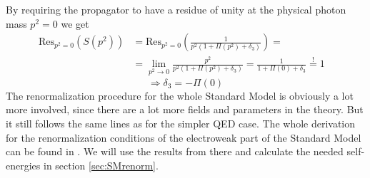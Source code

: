 By requiring the propagator to have a residue of unity at the physical photon mass $p^2=0$ we get
\begin{align*}
\mathrm{Res}_{p^2 = 0} \left( S(p^2) \right) & = \mathrm{Res}_{p^2=0} \left( \frac{1}{p^2 \left( 1 + \Pi(p^2) + \delta_3 \right)} \right) = & \\
& = \lim_{p^2 \rightarrow 0} \frac{p^2}{p^2 \left( 1 + \Pi(p^2) + \delta_3 \right)} = \frac{1}{1+\Pi(0)+\delta_3} \overset{\mathrm{!}}{=} 1 &
\end{align*}
\begin{equation}
\label{eqn:d3}
\Rightarrow \delta_3 = - \Pi(0)
\end{equation}
The renormalization procedure for the whole Standard Model is obviously a lot more involved, since there are a lot more fields and parameters in the theory. But it still follows the same lines as for the simpler QED case. The whole derivation for the renormalization conditions of the electroweak part of the Standard Model can be found in \cite{SMrenorm}. We will use the results from there and calculate the needed self-energies in section \ref{sec:SMrenorm}. \\

